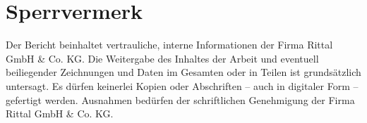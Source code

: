 \chapter*{Sperrvermerk}

Der Bericht beinhaltet vertrauliche, interne Informationen der Firma Rittal GmbH \& Co. KG. 
Die Weitergabe des Inhaltes der Arbeit und eventuell beiliegender Zeichnungen und Daten im Gesamten oder in Teilen ist grundsätzlich untersagt. Es dürfen keinerlei Kopien oder Abschriften – auch in digitaler Form – gefertigt werden. Ausnahmen bedürfen der schriftlichen Genehmigung der Firma Rittal GmbH \& Co. KG.


